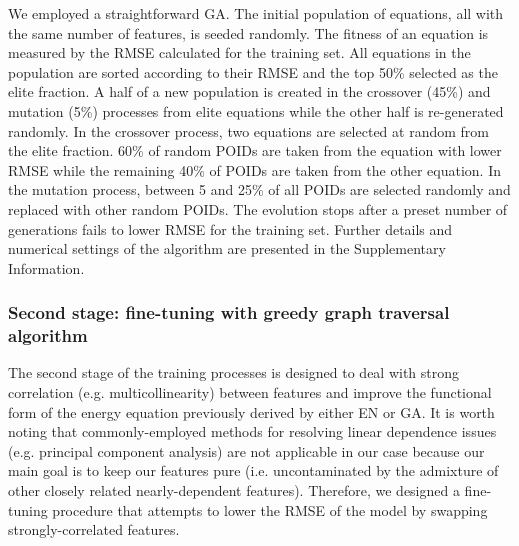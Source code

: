 \documentclass[aip,jcp,reprint,amsmath,amssymb,nature]{revtex4-1}
\begin{document}
We employed a straightforward GA. 
The initial population of equations, all with the same number of features, is seeded randomly. 
The fitness of an equation is measured by the RMSE calculated for the training set. 
All equations in the population are sorted according to their RMSE and the top 50\% selected as the elite fraction.
A half of a new population is created in the crossover (45\%) and mutation (5\%) processes from elite equations while the other half is re-generated randomly. 
In the crossover process, two equations are selected at random from the elite fraction. 60\% of random POIDs are taken from the equation with lower RMSE while the remaining 40\% of POIDs are taken from the other equation. 
In the mutation process, between 5 and 25\% of all POIDs are selected randomly and replaced with other random POIDs. 
The evolution stops after a preset number of generations fails to lower RMSE for the training set. Further details and numerical settings of the algorithm are presented in the Supplementary Information.


\subsubsection{Second stage: fine-tuning with greedy graph traversal algorithm} 

The second stage of the training processes is designed to deal with strong correlation (e.g. multicollinearity) between features and improve the functional form of the energy equation previously derived by either EN or GA. 
It is worth noting that commonly-employed methods for resolving linear dependence issues (e.g. principal component analysis) are not applicable in our case because our main goal is to keep our features pure (i.e. uncontaminated by the admixture of other closely related nearly-dependent features). 
Therefore, we designed a fine-tuning procedure that attempts to lower the RMSE of the model by swapping strongly-correlated features. 
\end{document}

